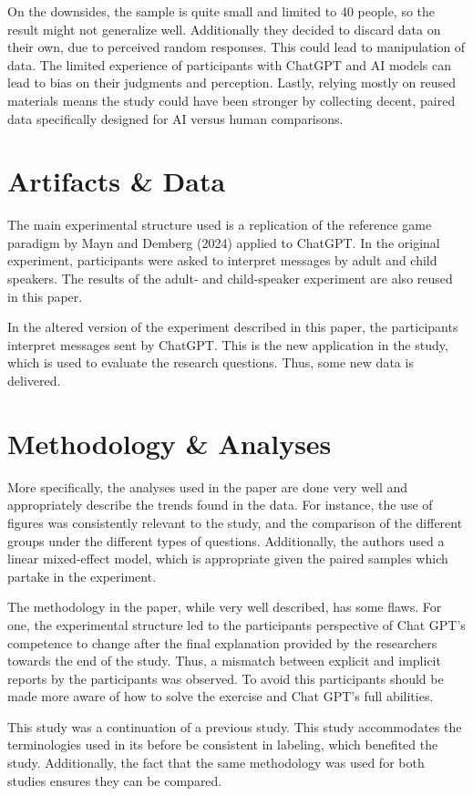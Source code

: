 \documentclass[12pt]{article}
\begin{document}
On the downsides, the sample is quite small and limited to 40 people, so the result might not generalize well. Additionally they decided to discard data on their own, due to perceived random responses. This could lead to manipulation of data. The limited experience of participants with ChatGPT and AI models can lead to bias on their judgments and perception. Lastly, relying mostly on reused materials means the study could have been stronger by collecting decent, paired data specifically designed for AI versus human comparisons.


\section{Artifacts \& Data}
The main experimental structure used is a replication of the reference game paradigm by Mayn and Demberg (2024) applied to ChatGPT. In the original experiment, participants were asked to interpret messages by adult and child speakers. The results of the adult- and child-speaker experiment are also reused in this paper. 

In the altered version of the experiment described in this paper, the participants interpret messages sent by ChatGPT. This is the new application in the study, which is used to evaluate the research questions. Thus, some new data is delivered.


\section{Methodology \& Analyses}
More specifically, the analyses used in the paper are done very well and appropriately describe the trends found in the data. For instance, the use of figures was consistently relevant to the study, and the comparison of the different groups under the different types of questions. Additionally, the authors used a linear mixed-effect model, which is appropriate given the paired samples which partake in the experiment. 

The methodology in the paper, while very well described, has some flaws. For one, the experimental structure led to the participants perspective of Chat GPT's competence to change after the final explanation provided by the researchers towards the end of the study. Thus, a mismatch between explicit and implicit reports by the participants was observed. To avoid this participants should be made more aware of how to solve the exercise and Chat GPT's full abilities. 

This study was a continuation of a previous study. This study accommodates the terminologies used in its before be consistent in labeling, which benefited the study. Additionally, the fact that the same methodology was used for both studies ensures they can be compared. 
\end{document}
